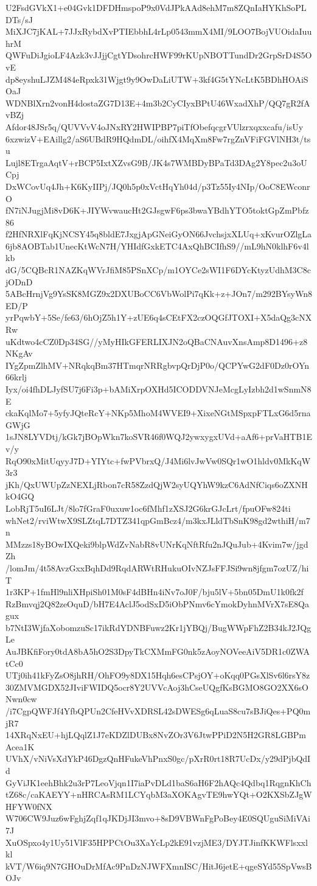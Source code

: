 U2FsdGVkX1+e04Gvk1DFDHmspoP9x0VdJPkAAd8ehM7m8ZQnIaHYKhSoPLDTs/sJ
MiXJC7jKAL+7JJxRybdXvPTIEbbhL4rLp0543mmX4MI/9LOO7BojVUOidaIuuhrM
QWFuDiJgioLF4Azk3vJJjjCgtYDsohrcHWF99rKUpNBOTTundDr2GrpSrD4S5OvE
dp8eyshuLJZM484eRpxk31Wjgt9y9OwDaLiUTW+3kf4G5tYNcLtK5BDhHOAiSOaJ
WDNBlXrn2vonH4dostaZG7D13E+4m3b2CyCIyxBPtU46WxadXhP/QQ7gR2fAvBZj
Afdor48JSr5q/QUVVvV4oJNxRY2HWIPBP7piTfObefqcgrVUlzrxqxxcafu/isUy
6xzwizV+EAillg2/aS6UBdR9HQdmDL/oihfX4MqXm8Fw7rgZnVFiFGVlNH3t/tsu
Lujl8ETrgaAqtV+rBCP5IxtXZvsG9B/JK4s7WMBDyBPaTd3DAg2Y8pec2u3oUCpj
DxWCovUq4Jh+K6KyIIPj/JQ0h5p0xVctHqYh04d/p3Tz55Iy4NIp/OoC8EWconrO
fN7iNJugjMi8vD6K+JIYWvwaucHt2GJsgwF6ps3bwaYBdhYTO5toktGpZmPbfz86
f2HfNRXlFqKjNCSY45q8bldE7JxgjApGNeiGyON66JvchsjxXLUq+xKvurOZlgLa
6jb8AOBTab1UnecKtWcN7H/YHIdfGxkETC4AxQhBCIfhS9//mL9hN0klhF6v4lkb
dG/5CQBcR1NAZKqWVrJfiM85PSnXCp/m1OYCe2sWI1F6DYcKtyzUdhM3C8cjODnD
5ABcHrnjVg9YsSK8MGZ9x2DXUBoCC6VbWolPi7qKk+z+JOn7/m292BYsyWn8ED/P
yrPqwbY+5Se/fe63/6hOjZ5h1Y+zUE6q4sCEtFX2czOQGfJTOXI+X5daQg3cNXRw
uKdtwo4cCZ0Dp34SG//yMyHIkGFERLIXJN2oQBaCNAuvXnsAmp8D1496+z8NKgAv
IYgZpmZlhMV+NRqkqBm37HTmqrNRRgbvpQrDjP0o/QCPYwG2dF0Dz0rOYn66krlj
Iyx/oi4fhDLJyfSU7j6Fi3p+bAMiXrpOXHd5ICODDVNJeMcgLyIzbh2d1wSnmN8E
ckaKqlMo7+5yfyJQteRcY+NKp5MhoM4WVEI9+XixeNGtMSpxpFTLxG6d5rnaGWjG
1sJN8LYVDtj/kGk7jBOpWkn7koSVR46f0WQJ2ywxygxUVd+aAf6+prVaHTB1Ev/y
RqO90xMitUqyyJ7D+YIYtc+fwPVbrxQ/J4Mi6lvJwVw0SQr1wO1hldv0MkKqW3r3
jKh/QxUWUpZzNEXLjRbon7cR58ZzdQjW2syUQYhW9kzC6AdNfCiqs6oZXNHkO4GQ
LobRjT5uI6LJt/8lo7fGraF0uxuw1oc6fMhf1zXSJ2G6krGJcLrt/fpuOFw824ti
whNet2/rviWtwX9SLZtqL7DTZ341qpGmBcz4/m3kxJLldTbSnK98gd2wthiH/m7n
MMzzs18yBOwIXQeki9blpWdZvNabR8vUNrKqNftRfu2nJQuJub+4Kvim7w/jgdZh
/lomJm/4t58AvzGxxBqhDd9RqdARWtRHukuOIvNZJsFFJSi9wn8jfgm7ozUZ/hiT
1r3KP+1fmHl9nliXHpiSh01M0sF4dBHn4iNv7oJ0F/bju5lV+5bn05DmU1k0fk2f
RzBmvqj2Q82zeOquD/bH7E4AclJ5odSxD5iObPNmv6cYmokDyhnMVrX7sE8Qagux
b7NtI3WjfaXobomzuSc17ikRdYDNBFuwz2Kr1jYBQj/BugWWpFhZ2B34kJ2JQgLe
AuJBKfiFory0tdA8bA5hO2S3DpyTkCXMmFG0nk5zAoyNOVeeAiV5DR1c0ZWAtCc0
UTj0ih41kFyZsO8jhRH/OhFO9y8DX15Hqh6esCPsjOY+oKqq0PGsXlSv6l6rsY8z
30ZMVMGDX52JIviFWIDQ5ocr8Y2UVVcAoj3hCseUQgfKsBGMO8GO2XX6sONwn0cw
/i7CgpQWFJf4YfbQPUn2CfeHVvXDRSL42sDWESg6qLuaS8cu7sBJiQes+PQ0mjR7
14XRqNxEU+hjLQqlZ1J7eKDZlDUBx8NvZOr3V6JtwPPiD2N5H2GR8LGBPmAcea1K
UVhX/vNiVsXdYkP46DgzQnHFukeVhPnxS0gc/pXrR0rt18R7UcDx/y29dPjbQdId
GyViJK1eehBhk2u3rP7LeoVjqn1I7iaPvDLd1baS6aH6F2hAQc4Qdbq1RqgnKhCh
tZ68c/caKAEYY+nHRCAsRM1LCYqbM3aXOKAgvTE9hwYQt+O2KXSbZJgWHFYW0fNX
W706CW9Juz6wFghjZqf1qJKDjJI3mvo+8sD9VBWnFgPoBey4E0SQUguSiMiVAi7J
XuOSpxo4y1Uy51VlF35HPPCtOu3XaYcLp2kE91vzjME3/DYJTJinfKKWFlsxxlkl
kVT/W6iq9N7GHOuDrMfAc9PnDzNJWFXmnISC/HitJ6jetE+qgeSYd55SpVwsBOJv
